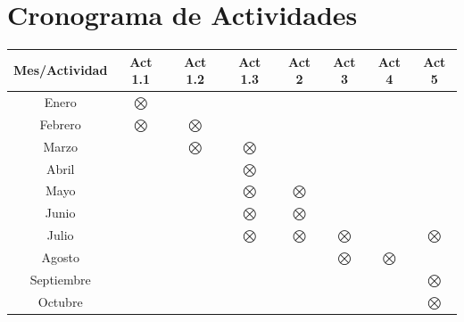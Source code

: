 \documentclass[11pt]{article}
\begin{document}
\section{Cronograma de Actividades}	


\begin{center}
{\small
\begin{tabular}{|c|c|c|c|c|c|c|c|}
\hline

\textbf{Mes}/\textbf{Actividad}&\textbf{Act 1.1}&\textbf{Act 1.2}
&\textbf{Act 1.3}&\textbf{Act 2}&\textbf{Act 3}&\textbf{Act 4}&\textbf{Act 5}\\

\hline

Enero&$\bigotimes$&&&&&&\\

\hline

Febrero&$\bigotimes$&$\bigotimes$&&&&&\\

\hline

Marzo&&$\bigotimes$&$\bigotimes$&&&&\\

\hline

Abril&&&$\bigotimes$&&&&\\

\hline

Mayo&&&$\bigotimes$&$\bigotimes$&&&\\

\hline

Junio&&&$\bigotimes$&$\bigotimes$&&&\\

\hline
Julio&&&$\bigotimes$&$\bigotimes$&$\bigotimes$&&$\bigotimes$\\

\hline

Agosto&&&&&$\bigotimes$&$\bigotimes$&\\

\hline 

Septiembre&&&&&&&$\bigotimes$\\

\hline
Octubre&&&&&&&$\bigotimes$\\
\hline

\end{tabular}
}
\end{center}



\medskip







\end{document}
